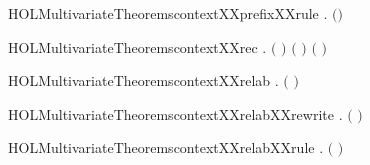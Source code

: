 \newcommand{\HOLMultivariateTheoremscontextXXprefixXXrewrite}{\UseVerbatim{HOLMultivariateTheoremscontextXXprefixXXrewrite}}
\begin{SaveVerbatim}{HOLMultivariateTheoremscontextXXprefixXXrule}
\HOLTokenTurnstile{} \HOLSymConst{\HOLTokenForall{}}  .    \HOLSymConst{\HOLTokenImp{}}   \ensuremath{(}\HOLSymConst{\ensuremath{\ldotp}}\ensuremath{)}
\end{SaveVerbatim}
\newcommand{\HOLMultivariateTheoremscontextXXprefixXXrule}{\UseVerbatim{HOLMultivariateTheoremscontextXXprefixXXrule}}
\begin{SaveVerbatim}{HOLMultivariateTheoremscontextXXrec}
\HOLTokenTurnstile{} \HOLSymConst{\HOLTokenForall{}}  .
         \ensuremath{(}  \ensuremath{)} \HOLSymConst{\HOLTokenImp{}}  \ensuremath{(}   \ensuremath{)} \ensuremath{(} \ensuremath{)}
\end{SaveVerbatim}
\newcommand{\HOLMultivariateTheoremscontextXXrec}{\UseVerbatim{HOLMultivariateTheoremscontextXXrec}}
\begin{SaveVerbatim}{HOLMultivariateTheoremscontextXXrelab}
\HOLTokenTurnstile{} \HOLSymConst{\HOLTokenForall{}}  .   \ensuremath{(}  \ensuremath{)} \HOLSymConst{\HOLTokenImp{}}   
\end{SaveVerbatim}
\newcommand{\HOLMultivariateTheoremscontextXXrelab}{\UseVerbatim{HOLMultivariateTheoremscontextXXrelab}}
\begin{SaveVerbatim}{HOLMultivariateTheoremscontextXXrelabXXrewrite}
\HOLTokenTurnstile{} \HOLSymConst{\HOLTokenForall{}}  .   \ensuremath{(}  \ensuremath{)} \HOLSymConst{\HOLTokenEquiv{}}   
\end{SaveVerbatim}
\newcommand{\HOLMultivariateTheoremscontextXXrelabXXrewrite}{\UseVerbatim{HOLMultivariateTheoremscontextXXrelabXXrewrite}}
\begin{SaveVerbatim}{HOLMultivariateTheoremscontextXXrelabXXrule}
\HOLTokenTurnstile{} \HOLSymConst{\HOLTokenForall{}}  .    \HOLSymConst{\HOLTokenImp{}}   \ensuremath{(}  \ensuremath{)}
\end{SaveVerbatim}
